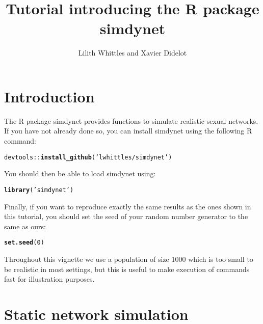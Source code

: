 \documentclass[a4paper]{article}\usepackage[]{graphicx}\usepackage[]{color}
\title{Tutorial introducing the R package simdynet}
\author{Lilith Whittles and Xavier Didelot}
\makeatletter
\newcommand{\hlnum}[1]{\textcolor[rgb]{0.686,0.059,0.569}{#1}}%
\newcommand{\hlstr}[1]{\textcolor[rgb]{0.192,0.494,0.8}{#1}}%
\newcommand{\hlopt}[1]{\textcolor[rgb]{0,0,0}{#1}}%
\newcommand{\hlstd}[1]{\textcolor[rgb]{0.345,0.345,0.345}{#1}}%
\newcommand{\hlkwd}[1]{\textcolor[rgb]{0.737,0.353,0.396}{\textbf{#1}}}%
\newenvironment{kframe}{%
 \def\at@end@of@kframe{}%
 \ifinner\ifhmode%
  \def\at@end@of@kframe{\end{minipage}}%
  \begin{minipage}{\columnwidth}%
 \fi\fi%
 \def\FrameCommand##1{\hskip\@totalleftmargin \hskip-\fboxsep
 \colorbox{shadecolor}{##1}\hskip-\fboxsep
     \hskip-\linewidth \hskip-\@totalleftmargin \hskip\columnwidth}%
 \MakeFramed {\advance\hsize-\width
   \@totalleftmargin\z@ \linewidth\hsize
   \@setminipage}}%
 {\par\unskip\endMakeFramed%
 \at@end@of@kframe}
\newenvironment{knitrout}{}{} %
\makeatother
\begin{document}
\maketitle

\section{Introduction}

The R package simdynet provides functions to simulate realistic sexual networks.
If you have not already done so, you can install simdynet using the following R command:

\begin{knitrout}
\color{fgcolor}\begin{kframe}
\begin{alltt}
\hlstd{devtools}\hlopt{::}\hlkwd{install_github}\hlstd{(}\hlstr{'lwhittles/simdynet'}\hlstd{)}
\end{alltt}
\end{kframe}
\end{knitrout}

You should then be able to load simdynet using:
\begin{knitrout}
\color{fgcolor}\begin{kframe}
\begin{alltt}
\hlkwd{library}\hlstd{(}\hlstr{'simdynet'}\hlstd{)}
\end{alltt}
\end{kframe}
\end{knitrout}

Finally, if you want to reproduce exactly the same results as the ones shown in this tutorial, you should set the seed of your random number generator to the same as ours:
\begin{knitrout}
\color{fgcolor}\begin{kframe}
\begin{alltt}
\hlkwd{set.seed}\hlstd{(}\hlnum{0}\hlstd{)}
\end{alltt}
\end{kframe}
\end{knitrout}

Throughout this vignette we use a population of size 1000 which is too small to be realistic in most settings, but this is useful to make execution of commands fast for illustration purposes.

\section{Static network simulation}
\end{document}
